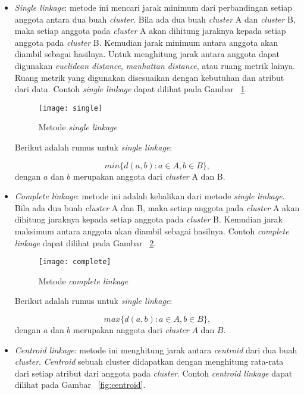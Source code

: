 \begin{itemize}

\item \textit{Single linkage}: metode ini mencari jarak minimum dari perbandingan setiap anggota antara dua buah \textit{cluster}. Bila ada dua buah \textit{cluster} A dan \textit{cluster} B, maka setiap anggota pada \textit{cluster} A akan dihitung jaraknya kepada setiap anggota pada \textit{cluster} B. Kemudian jarak minimum antara anggota akan diambil sebagai hasilnya. Untuk menghitung jarak antara anggota dapat digunakan \textit{euclidean distance}, \textit{manhattan distance}, atau ruang metrik lainya. Ruang metrik yang digunakan disesuaikan dengan kebutuhan dan atribut dari data. Contoh \textit{single linkage} dapat dilihat pada Gambar ~\ref{fig:single}.

\begin{figure}[H]
    \centering  
    \texttt{[image: single]}  
    \caption[Metode {\it single linkage} ]{Metode {\it single linkage}} 
    \label{fig:single} 
\end{figure}

Berikut adalah rumus untuk \textit{single linkage}:

$$
min\{ d(a,b): a \in A, b \in B\}, 
$$
dengan $a$ dan $b$ merupakan anggota dari \textit{cluster} A dan B.\\

\item \textit{Complete linkage}: metode ini adalah kebalikan dari metode \textit{single linkage}. Bila ada dua buah \textit{cluster} A dan B, maka setiap anggota pada \textit{cluster} A akan dihitung jaraknya kepada setiap anggota pada \textit{cluster} B. Kemudian jarak maksimum antara anggota akan diambil sebagai hasilnya. Contoh  \textit{complete linkage} dapat dilihat pada Gambar ~\ref{fig:complete}.

\begin{figure}[H]
    \centering  
    \texttt{[image: complete]}  
    \caption[Metode {\it complete linkage} ]{Metode {\it complete linkage}} 
    \label{fig:complete} 
\end{figure}

Berikut adalah rumus untuk \textit{single linkage}:

$$
max\{ d(a,b): a \in A, b \in B\}, 
$$
dengan $a$ dan $b$ merupakan anggota dari \textit{cluster} $A$ dan $B$.\\


\item \textit{Centroid linkage}: metode ini menghitung jarak antara \textit{centroid} dari dua buah \textit{cluster}.  \textit{Centroid} sebuah cluster didapatkan dengan menghitung rata-rata dari setiap atribut dari anggota pada \textit{cluster}. Contoh  \textit{centroid linkage} dapat dilihat pada Gambar ~\ref{fig:centroid}. 


\end{itemize}
